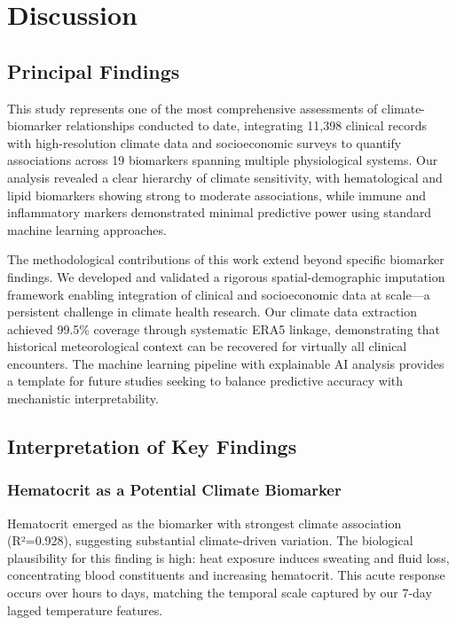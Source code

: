 \section{Discussion}

\subsection{Principal Findings}

This study represents one of the most comprehensive assessments of climate-biomarker relationships conducted to date, integrating 11,398 clinical records with high-resolution climate data and socioeconomic surveys to quantify associations across 19 biomarkers spanning multiple physiological systems. Our analysis revealed a clear hierarchy of climate sensitivity, with hematological and lipid biomarkers showing strong to moderate associations, while immune and inflammatory markers demonstrated minimal predictive power using standard machine learning approaches.

The methodological contributions of this work extend beyond specific biomarker findings. We developed and validated a rigorous spatial-demographic imputation framework enabling integration of clinical and socioeconomic data at scale---a persistent challenge in climate health research. Our climate data extraction achieved 99.5\% coverage through systematic ERA5 linkage, demonstrating that historical meteorological context can be recovered for virtually all clinical encounters. The machine learning pipeline with explainable AI analysis provides a template for future studies seeking to balance predictive accuracy with mechanistic interpretability.

\subsection{Interpretation of Key Findings}

\subsubsection{Hematocrit as a Potential Climate Biomarker}

Hematocrit emerged as the biomarker with strongest climate association (R²=0.928), suggesting substantial climate-driven variation. The biological plausibility for this finding is high: heat exposure induces sweating and fluid loss, concentrating blood constituents and increasing hematocrit. This acute response occurs over hours to days, matching the temporal scale captured by our 7-day lagged temperature features.

